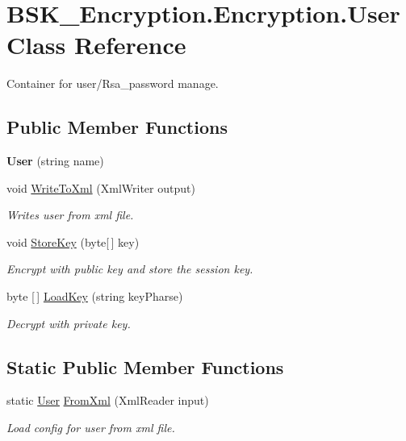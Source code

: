\hypertarget{class_b_s_k___encryption_1_1_encryption_1_1_user}{}\section{B\+S\+K\+\_\+\+Encryption.\+Encryption.\+User Class Reference}
\label{class_b_s_k___encryption_1_1_encryption_1_1_user}


Container for user/\+Rsa\+\_\+password manage.  


\subsection*{Public Member Functions}
\begin{DoxyCompactItemize}
\item 
\mbox{\label{class_b_s_k___encryption_1_1_encryption_1_1_user_aa527816e42c0943ef512e6556faf3563}} 
{\bfseries User} (string name)
\item 
void \mbox{\hyperlink{class_b_s_k___encryption_1_1_encryption_1_1_user_a881a5e8ff2f140aa2c05be2213522a5f}{Write\+To\+Xml}} (Xml\+Writer output)
\begin{DoxyCompactList}\small\item\em Writes user from xml file. \end{DoxyCompactList}\item 
void \mbox{\hyperlink{class_b_s_k___encryption_1_1_encryption_1_1_user_a7f44735ece5103022d100d3b5780e82d}{Store\+Key}} (byte\mbox{[}$\,$\mbox{]} key)
\begin{DoxyCompactList}\small\item\em Encrypt with public key and store the session key. \end{DoxyCompactList}\item 
byte \mbox{[}$\,$\mbox{]} \mbox{\hyperlink{class_b_s_k___encryption_1_1_encryption_1_1_user_a60bacb1a794eae94f4f38e3fc3801e03}{Load\+Key}} (string key\+Pharse)
\begin{DoxyCompactList}\small\item\em Decrypt with private key. \end{DoxyCompactList}\end{DoxyCompactItemize}
\subsection*{Static Public Member Functions}
\begin{DoxyCompactItemize}
\item 
static \mbox{\hyperlink{class_b_s_k___encryption_1_1_encryption_1_1_user}{User}} \mbox{\hyperlink{class_b_s_k___encryption_1_1_encryption_1_1_user_ae5f1c5220e3588843a0cd2850d8bf61a}{From\+Xml}} (Xml\+Reader input)
\begin{DoxyCompactList}\small\item\em Load config for user from xml file. \end{DoxyCompactList}\end{DoxyCompactItemize}

